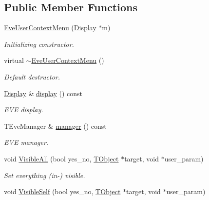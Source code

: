 \subsection*{Public Member Functions}
\begin{DoxyCompactItemize}
\item 
\hyperlink{class_d_d4hep_1_1_eve_user_context_menu_a2ea274ad2ba442a5ecfa2b438ee4d4aa}{EveUserContextMenu} (\hyperlink{class_d_d4hep_1_1_display}{Display} $\ast$m)
\begin{DoxyCompactList}\small\item\em Initializing constructor. \item\end{DoxyCompactList}\item 
virtual \hyperlink{class_d_d4hep_1_1_eve_user_context_menu_a48d1bbc000743f3a363ea230ab4eeb0c}{$\sim$EveUserContextMenu} ()
\begin{DoxyCompactList}\small\item\em Default destructor. \item\end{DoxyCompactList}\item 
\hyperlink{class_d_d4hep_1_1_display}{Display} \& \hyperlink{class_d_d4hep_1_1_eve_user_context_menu_a9f9c6ac57dba775c31a0375064ab026b}{display} () const 
\begin{DoxyCompactList}\small\item\em EVE display. \item\end{DoxyCompactList}\item 
TEveManager \& \hyperlink{class_d_d4hep_1_1_eve_user_context_menu_acf19209641571573fae6b6e854ca07ed}{manager} () const 
\begin{DoxyCompactList}\small\item\em EVE manager. \item\end{DoxyCompactList}\item 
void \hyperlink{class_d_d4hep_1_1_eve_user_context_menu_ac41f26a1ef86468fb37da4a1fad9b4df}{VisibleAll} (bool yes\_\-no, \hyperlink{class_t_object}{TObject} $\ast$target, void $\ast$user\_\-param)
\begin{DoxyCompactList}\small\item\em Set everything (in-\/) visible. \item\end{DoxyCompactList}\item 
void \hyperlink{class_d_d4hep_1_1_eve_user_context_menu_a2c1bc8b4c3aa1fbedb1eed0c26b2fe65}{VisibleSelf} (bool yes\_\-no, \hyperlink{class_t_object}{TObject} $\ast$target, void $\ast$user\_\-param)

\end{DoxyCompactItemize}
